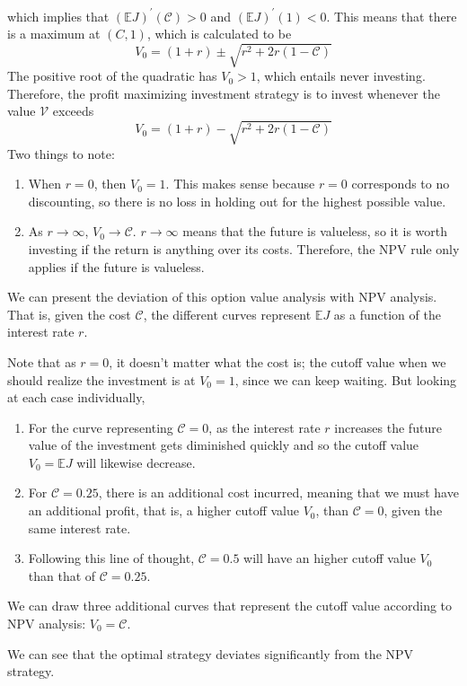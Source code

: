 \documentclass{article}
\begin{document}
      which implies that $(\mathbb{E} J)^\prime (\mathcal{C}) > 0$ and $(\mathbb{E}J)^\prime (1) < 0$. This means that there is a maximum at $(C, 1)$, which is calculated to be
      \begin{equation}
        V_0 = (1 + r) \pm \sqrt{r^2 + 2r (1-\mathcal{C})}
      \end{equation}
      The positive root of the quadratic has $V_0 > 1$, which entails never investing. Therefore, the profit maximizing investment strategy is to invest whenever the value $\mathcal{V}$ exceeds 
      \begin{equation}
        V_0 = (1 + r) - \sqrt{r^2 + 2r (1-\mathcal{C})}
      \end{equation}
      Two things to note: 
      \begin{enumerate}
        \item When $r=0$, then $V_0 = 1$. This makes sense because $r=0$ corresponds to no discounting, so there is no loss in holding out for the highest possible value. 
        \item As $r \rightarrow \infty$, $V_0 \rightarrow \mathcal{C}$. $r \rightarrow \infty$ means that the future is valueless, so it is worth investing if the return is anything over its costs. Therefore, the NPV rule only applies if the future is valueless. 
      \end{enumerate}
      We can present the deviation of this option value analysis with NPV analysis. That is, given the cost $\mathcal{C}$, the different curves represent $\mathbb{E} J$ as a function of the interest rate $r$. 
      \begin{center}
      \end{center}
      Note that as $r = 0$, it doesn't matter what the cost is; the cutoff value when we should realize the investment is at $V_0 = 1$, since we can keep waiting. But looking at each case individually, 
      \begin{enumerate}
        \item For the curve representing $\mathcal{C} = 0$, as the interest rate $r$ increases the future value of the investment gets diminished quickly and so the cutoff value $V_0 = \mathbb{E} J$ will likewise decrease. 
        \item For $\mathcal{C} = 0.25$, there is an additional cost incurred, meaning that we must have an additional profit, that is, a higher cutoff value $V_0$, than $\mathcal{C} = 0$, given the same interest rate. 
        \item Following this line of thought, $\mathcal{C} = 0.5$ will have an higher cutoff value $V_0$ than that of $\mathcal{C} = 0.25$. 
      \end{enumerate}
      We can draw three additional curves that represent the cutoff value according to NPV analysis: $V_0 = \mathcal{C}$. 
      \begin{center}
      \end{center}
      We can see that the optimal strategy deviates significantly from the NPV strategy. 
\end{document}
